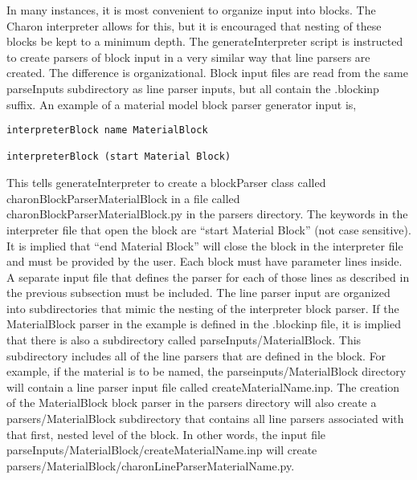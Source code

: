 In many instances, it is most convenient to organize input into
blocks.  The Charon interpreter allows for this, but it is encouraged
that nesting of these blocks be kept to a minimum depth.  The
generateInterpreter script is instructed to create parsers of block
input in a very similar way that line parsers are created.  The
difference is organizational.  Block input files are read from the
same parseInputs subdirectory as line parser inputs, but all contain
the .blockinp suffix.  An example of a material model block parser
generator input is,
\begin{lstlisting}
interpreterBlock name MaterialBlock

interpreterBlock (start Material Block)
\end{lstlisting}
This tells generateInterpreter to create a blockParser class called
charonBlockParserMaterialBlock in a file called
charonBlockParserMaterialBlock.py in the parsers directory.  The
keywords in the interpreter file that open the block are ``start
Material Block'' (not case sensitive).  It is implied that ``end
Material Block'' will close the block in the interpreter file and must
be provided by the user.  Each block must have parameter lines inside.
A separate input file that defines the parser for each of those lines
as described in the previous subsection must be included.  The line
parser input are organized into subdirectories that mimic the nesting
of the interpreter block parser.  If the MaterialBlock parser in the
example is defined in the .blockinp file, it is implied that there is
also a subdirectory called parseInputs/MaterialBlock.  This
subdirectory includes all of the line parsers that are defined in the
block.  For example, if the material is to be named, the
parseinputs/MaterialBlock directory will contain a line parser input
file called createMaterialName.inp.  The creation of the MaterialBlock
block parser in the parsers directory will also create a
parsers/MaterialBlock subdirectory that contains all line parsers
associated with that first, nested level of the block.  In other
words, the input file parseInputs/MaterialBlock/createMaterialName.inp
will create parsers/MaterialBlock/charonLineParserMaterialName.py.

